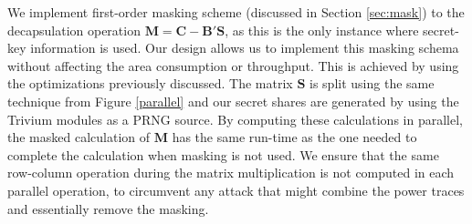 We implement first-order masking scheme (discussed in Section \ref{sec:mask}) to the decapsulation operation $\mathbf{M} = \mathbf{C} - \mathbf{B}'\mathbf{S}$, as this is the only instance where secret-key information is used. Our design allows us to implement this masking schema without affecting the area consumption or throughput. This is achieved by using the optimizations previously discussed. The matrix $\mathbf{S}$ is split using the same technique from Figure \ref{parallel} and our secret shares are generated by using the Trivium modules as a PRNG source. By computing these calculations in parallel, the masked calculation of $\mathbf{M}$ has the same run-time as the one needed to complete the calculation when masking is not used. We ensure that the same row-column operation during the matrix multiplication is not computed in each parallel operation, to circumvent any attack that might combine the power traces and essentially remove the masking.